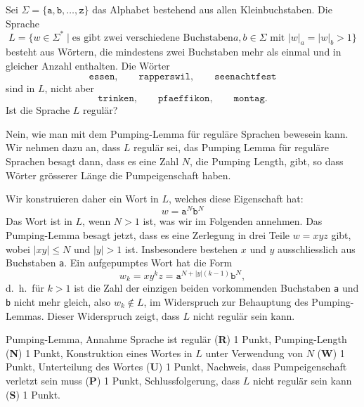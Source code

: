 Sei $\Sigma=\{\texttt{a},\texttt{b},\dots,\texttt{z}\}$ das Alphabet bestehend
aus allen Kleinbuchstaben.
Die Sprache
\[
L=\{w\in\Sigma^*\;|\;\text{es gibt zwei verschiedene Buchstaben
$a,b\in\Sigma$ mit $|w|_a=|w|_b > 1$}\}
\]
besteht aus Wörtern, die mindestens zwei Buchstaben mehr als einmal
und in gleicher Anzahl enthalten.
Die Wörter
\[
\texttt{essen},\qquad
\texttt{rapperswil},\qquad
\texttt{seenachtfest}
\]
sind in $L$, nicht aber
\[
\texttt{trinken},\qquad
\texttt{pfaeffikon},\qquad
\texttt{montag}.
\]
Ist die Sprache $L$ regulär?


\begin{loesung}
Nein, wie man mit dem Pumping-Lemma für reguläre Sprachen bewesein kann.
Wir nehmen dazu an, dass $L$ regulär sei, das Pumping Lemma für reguläre
Sprachen besagt dann, dass es eine Zahl $N$, die Pumping Length, gibt,
so dass Wörter grösserer Länge die Pumpeigenschaft haben.

Wir konstruieren daher ein Wort in $L$, welches diese Eigenschaft hat:
\[
w=\texttt{a}^N\texttt{b}^N
\]
Das Wort ist in $L$, wenn $N>1$ ist, was wir im Folgenden annehmen.
Das Pumping-Lemma besagt jetzt, dass es eine Zerlegung in drei 
Teile $w=xyz$ gibt, wobei $|xy|\le N$ und $|y|>1$ ist.
Insbesondere bestehen $x$ und $y$ ausschliesslich aus Buchstaben \texttt{a}.
Ein aufgepumptes Wort hat die Form
\[
w_k=xy^kz=\texttt{a}^{N+|y|(k-1)}\texttt{b}^N,
\]
d.~h.~für $k>1$ ist die Zahl der einzigen beiden vorkommenden Buchstaben
\texttt{a} und \texttt{b} nicht mehr gleich, also $w_k\not\in L$,
im Widerspruch zur Behauptung des Pumping-Lemmas.
Dieser Widerspruch zeigt, dass $L$ nicht regulär sein kann.
\end{loesung}

\begin{bewertung}
Pumping-Lemma, Annahme Sprache ist regulär ({\bf R}) 1 Punkt,
Pumping-Length ({\bf N}) 1 Punkt,
Konstruktion eines Wortes in $L$ unter Verwendung von $N$ ({\bf W}) 1 Punkt,
Unterteilung des Wortes ({\bf U}) 1 Punkt,
Nachweis, dass Pumpeigenschaft verletzt sein muss ({\bf P}) 1 Punkt,
Schlussfolgerung, dass $L$ nicht regulär sein kann ({\bf S}) 1 Punkt.
\end{bewertung}

